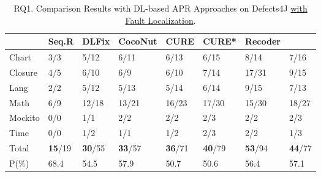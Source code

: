 



\begin{table}[t]
  \caption{RQ1. Comparison Results with DL-based APR Approaches on Defects4J \underline {with Fault Localization}.}
  \vspace{-6pt}
         {\footnotesize
        \tabcolsep 3.5pt
			\begin{center}
				\renewcommand{\arraystretch}{1}
				\begin{tabular}{p{0.8cm}<{\centering}|p{0.8cm}<{\centering}|p{0.9cm}<{\centering}|p{1cm}<{\centering}|p{0.8cm}<{\centering}|p{0.8cm}<{\centering}|p{1.0cm}<{\centering}|p{0.8cm}<{\centering}}
					
					\hline
					&\textbf{Seq.R}&\textbf{DLFix}& \textbf{CocoNut}&\textbf{CURE}&\textbf{CURE*}& {\bf Recoder} &\textbf{\tool}\\
					\hline
					Chart  & 3/3   & 5/12  & 6/11  & 6/13  & 6/15 & 8/14 & 7/16\\
					Closure& 4/5   & 6/10  & 6/9   & 6/10  & 7/14 & 17/31 & 9/15\\
					Lang   & 2/2   & 5/12  & 5/13  & 5/14  & 6/14  & 9/15 & 7/13\\
					Math    & 6/9  & 12/18 & 13/21 & 16/23 & 17/30 & 15/30 & 18/27\\
					Mockito & 0/0   & 1/1   & 2/2   & 2/2  & 2/3  & 2/2 & 2/3\\
					Time    & 0/0   & 1/2   & 1/1   & 1/2  & 2/3 & 2/2 & 1/3\\
					\hline
					Total   & {\bf 15}/19 & {\bf 30}/55 & {\bf 33}/57 & {\bf 36}/71 & {\bf 40}/79 & {\bf 53}/94 & {\bf 44}/77\\
					\hline
					P(\%)  & 68.4  & 54.5  & 57.9  & 50.7  & 50.6 & 56.4 & 57.1\\
					\hline
				\end{tabular}
				\label{RQ1_defects4J_with_FL}
			\end{center}
                }
		\end{table}

















